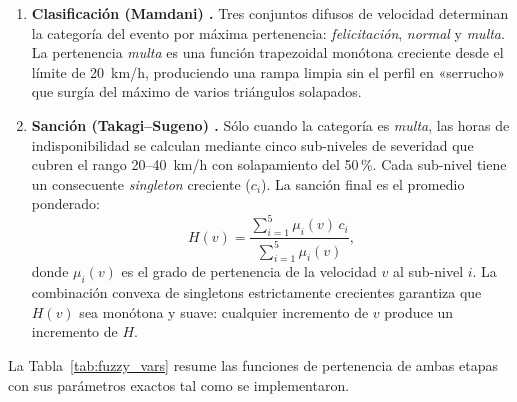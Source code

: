 \documentclass[11pt]{article}
\begin{document}
\begin{enumerate}
    \item \textbf{Clasificación (Mamdani) \cite{mamdani}.} Tres conjuntos difusos de
    velocidad determinan la categoría del evento por máxima pertenencia:
    \emph{felicitación}, \emph{normal} y \emph{multa}. La pertenencia \emph{multa} es
    una función trapezoidal monótona creciente desde el límite de 20~km/h,
    produciendo una rampa limpia sin el perfil en «serrucho» que surgía del máximo
    de varios triángulos solapados.

    \item \textbf{Sanción (Takagi--Sugeno) \cite{sugeno}.} Sólo cuando la categoría es
    \emph{multa}, las horas de indisponibilidad se calculan mediante cinco sub-niveles
    de severidad que cubren el rango 20--40~km/h con solapamiento del 50\,\%. Cada
    sub-nivel tiene un consecuente \emph{singleton} creciente ($c_i$). La sanción
    final es el promedio ponderado:
    \begin{equation}
        H(v) = \frac{\displaystyle\sum_{i=1}^{5} \mu_i(v)\, c_i}
                    {\displaystyle\sum_{i=1}^{5} \mu_i(v)},
        \label{eq:sugeno}
    \end{equation}
    donde $\mu_i(v)$ es el grado de pertenencia de la velocidad $v$ al sub-nivel $i$.
    La combinación convexa de singletons estrictamente crecientes garantiza que $H(v)$
    sea monótona y suave: cualquier incremento de $v$ produce un incremento de $H$.
\end{enumerate}

La Tabla~\ref{tab:fuzzy_vars} resume las funciones de pertenencia de ambas etapas con
sus parámetros exactos tal como se implementaron.
\end{document}
